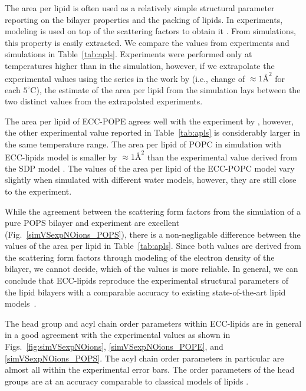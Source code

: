 The area per lipid is often used as a relatively simple structural parameter reporting on the bilayer properties and the packing of lipids. 
In experiments, modeling is used on top of the scattering factors to obtain it \citep{kucerka14}. 
From simulations, this property is easily extracted. 
We compare the values from experiments and simulations in Table~\ref{tab:apls}. 
Experiments were performed only at temperatures higher than in the simulation, 
however, if we extrapolate the experimental values using the series in the work by \citet{rappolt03} 
(i.e., change of $\approx 1Å^2$ for each $5^\circ$C), 
the estimate of the area per lipid from the simulation lays between the two distinct values from the extrapolated experiments. 

The area per lipid of ECC-POPE agrees well with the experiment by \citet{parsegian89}, 
however, the other experimental value reported in Table~\ref{tab:apls} is considerably larger in the same temperature range. 
The area per lipid of POPC in simulation with ECC-lipids model is smaller by $\approx 1Å^2$ 
than the experimental value derived from the SDP model \citep{kucerka14}. 
The values of the area per lipid of the ECC-POPC model vary slightly 
when simulated with different water models, however,
they are still close to the experiment. \citep{melcr18}

While the agreement between the scattering form factors 
from the simulation of a pure POPS bilayer and experiment 
are excellent (Fig.~\ref{simVSexpNOions_POPS}),
there is a non-negligable difference between the values of the area per lipid in Table~\ref{tab:apls}. 
Since both values are derived from the scattering form factors through modeling of the electron density of the bilayer,
we cannot decide, which of the values is more reliable. 
In general, we can conclude that ECC-lipids
reproduce the experimental structural parameters of the lipid bilayers 
with a comparable accuracy to existing state-of-the-art lipid models~\citep{botan15, ollila16, Pluhackova2016}. 
 
The head group and acyl chain order parameters within ECC-lipids
are in general in a good agreement with the experimental values 
as shown in Figs.~\ref{fig:simVSexpNOions}, \ref{simVSexpNOions_POPE},  and \ref{simVSexpNOions_POPS}. 
The acyl chain order parameters in particular are almost all within the experimental error bars.
The order parameters of the head groups are at an accuracy comparable to classical models of lipids \citep{botan15, catte16, Pluhackova2016}. 

